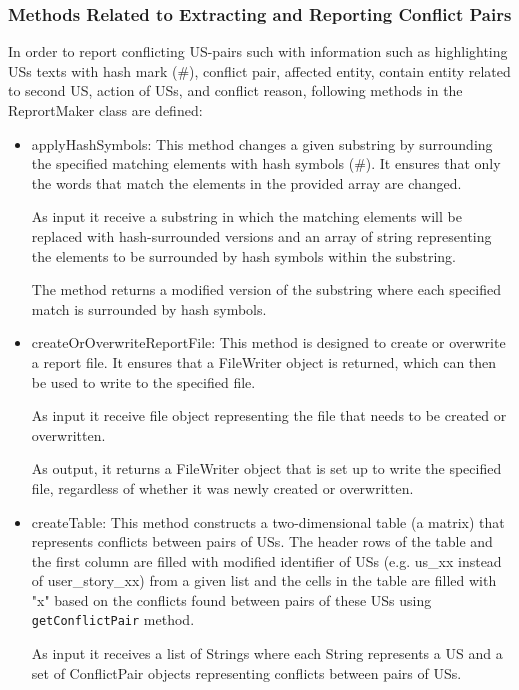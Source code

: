 \subsubsection*{Methods Related to Extracting and Reporting Conflict Pairs}
In order to report conflicting US-pairs such with information such as highlighting USs texts with hash mark (\#), conflict pair, affected entity, contain entity related to second US, action of USs, and conflict reason, following methods in the ReprortMaker class are defined:

\begin{itemize}
	\item applyHashSymbols: This method changes a given substring by surrounding the specified matching elements with hash symbols (\#). It ensures that only the words that match the elements in the provided array are changed. 
	
	As input it receive a substring in which the matching elements will be replaced with hash-surrounded versions and an array of string representing the elements to be surrounded by hash symbols within the substring.
	
	The method returns a modified version of the substring where each specified match is surrounded by hash symbols.
	
	\item createOrOverwriteReportFile: This method is designed to create or overwrite a report file. It ensures that a FileWriter object is returned, which can then be used to write to the specified file.
	
	As input it receive file object representing the file that needs to be created or overwritten.
	
	As output, it returns a FileWriter object that is set up to write the specified file, regardless of whether it was newly created or overwritten.
	
	\item createTable: This method constructs a two-dimensional table (a matrix) that represents conflicts between pairs of USs. The header rows of the table and the first column are filled with modified identifier of USs (e.g. us\_xx instead of user\_story\_xx) from a given list and the cells in the table are filled with "x" based on the conflicts found between pairs of these USs using \texttt{getConflictPair} method.
	
	As input it receives a list of Strings where each String represents a US and a set of ConflictPair objects representing conflicts between pairs of USs.
	

\end{itemize}
